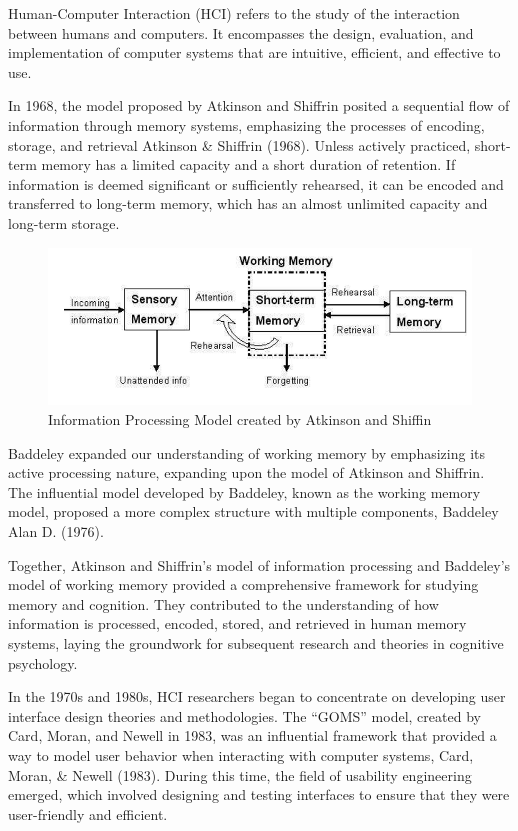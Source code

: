 \documentclass[print]{nuthesis}
\begin{document}
Human-Computer Interaction (HCI) refers to the study of the interaction between humans and computers. It encompasses the design, evaluation, and implementation of computer systems that are intuitive, efficient, and effective to use.

In 1968, the model proposed by Atkinson and Shiffrin posited a sequential flow of information through memory systems, emphasizing the processes of encoding, storage, and retrieval Atkinson \& Shiffrin (1968).
Unless actively practiced, short-term memory has a limited capacity and a short duration of retention.
If information is deemed significant or sufficiently rehearsed, it can be encoded and transferred to long-term memory, which has an almost unlimited capacity and long-term storage.

\begin{figure}

{\centering \includegraphics[width=0.45\linewidth]{figure/info_model} 

}

\caption{Information Processing Model created by Atkinson and Shiffin}\label{fig:atkinsonmodel}
\end{figure}

Baddeley expanded our understanding of working memory by emphasizing its active processing nature, expanding upon the model of Atkinson and Shiffrin.
The influential model developed by Baddeley, known as the working memory model, proposed a more complex structure with multiple components, Baddeley Alan D. (1976).

Together, Atkinson and Shiffrin's model of information processing and Baddeley's model of working memory provided a comprehensive framework for studying memory and cognition.
They contributed to the understanding of how information is processed, encoded, stored, and retrieved in human memory systems, laying the groundwork for subsequent research and theories in cognitive psychology.

In the 1970s and 1980s, HCI researchers began to concentrate on developing user interface design theories and methodologies.
The ``GOMS'' model, created by Card, Moran, and Newell in 1983, was an influential framework that provided a way to model user behavior when interacting with computer systems, Card, Moran, \& Newell (1983).
During this time, the field of usability engineering emerged, which involved designing and testing interfaces to ensure that they were user-friendly and efficient.
\end{document}
